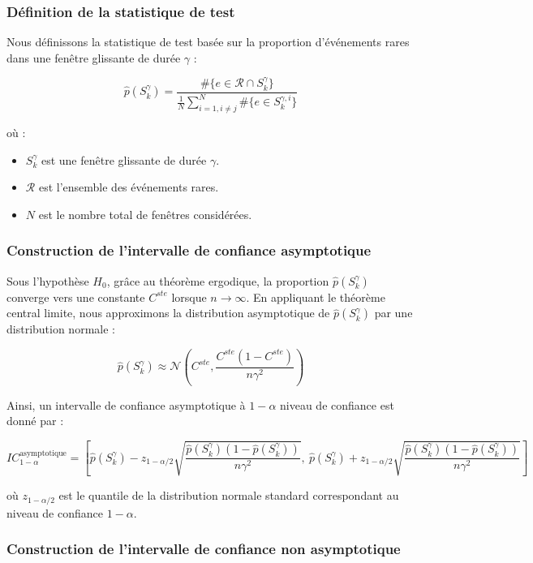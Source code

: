 \documentclass[12pt,a4paper]{article}
\theoremstyle{definition}
\theoremstyle{remark}
\begin{document}
\subsubsection{Définition de la statistique de test}

Nous définissons la statistique de test basée sur la proportion d'événements rares dans une fenêtre glissante de durée $\gamma$ :

$$
\hat{p}(S_k^{\gamma}) = \frac{\#\{e \in \mathcal{R} \cap S_k^{\gamma}\}}{\frac{1}{N} \sum_{i=1, i \neq j}^N \#\{e \in S_k^{\gamma, i}\}}
$$

où :
\begin{itemize}
    \item $S_k^{\gamma}$ est une fenêtre glissante de durée $\gamma$.
    \item $\mathcal{R}$ est l'ensemble des événements rares.
    \item $N$ est le nombre total de fenêtres considérées.
\end{itemize}

\subsubsection{Construction de l'intervalle de confiance asymptotique}

Sous l'hypothèse $H_0$, grâce au théorème ergodique, la proportion $\hat{p}(S_k^{\gamma})$ converge vers une constante $C^{ste}$ lorsque $n \to \infty$. En appliquant le théorème central limite, nous approximons la distribution asymptotique de $\hat{p}(S_k^{\gamma})$ par une distribution normale :

$$
\hat{p}(S_k^{\gamma}) \approx \mathcal{N}\left(C^{ste}, \frac{C^{ste}(1 - C^{ste})}{n \gamma^2}\right)
$$

Ainsi, un intervalle de confiance asymptotique à $1 - \alpha$ niveau de confiance est donné par :

$$
IC_{1 - \alpha}^{\text{asymptotique}} = \left[ \hat{p}(S_k^{\gamma}) - z_{1 - \alpha/2} \sqrt{\frac{\hat{p}(S_k^{\gamma})(1 - \hat{p}(S_k^{\gamma}))}{n \gamma^2}}, \ \hat{p}(S_k^{\gamma}) + z_{1 - \alpha/2} \sqrt{\frac{\hat{p}(S_k^{\gamma})(1 - \hat{p}(S_k^{\gamma}))}{n \gamma^2}} \right]
$$

où $z_{1 - \alpha/2}$ est le quantile de la distribution normale standard correspondant au niveau de confiance $1 - \alpha$.

\subsubsection{Construction de l'intervalle de confiance non asymptotique}
\end{document}

